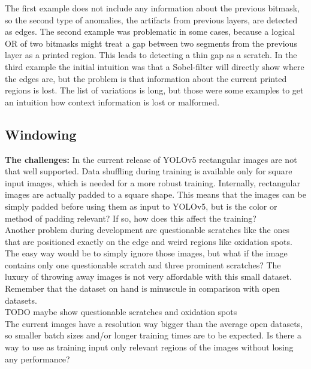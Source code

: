 The first example does not include any information about the previous bitmask, so the second type of anomalies, the artifacts from previous layers, are detected as edges. The second example was problematic in some cases, because a logical OR of two bitmasks might treat a gap between two segments from the previous layer as a printed region. This leads to detecting a thin gap as a scratch. In the third example the initial intuition was that a Sobel-filter will directly show where the edges are, but the problem is that information about the current printed regions is lost. The list of variations is long, but those were some examples to get an intuition how context information is lost or malformed.

\subsection{Windowing}

\textbf{The challenges:} In the current release of YOLOv5 rectangular images are not that well supported. Data shuffling during training is available only for square input images, which is needed for a more robust training. Internally, rectangular images are actually padded to a square shape. This means that the images can be simply padded before using them as input to YOLOv5, but is the color or method of padding relevant? If so, how does this affect the training? \\
Another problem during development are questionable scratches like the ones that are positioned exactly on the edge and weird regions like oxidation spots. The easy way would be to simply ignore those images, but what if the image contains only one questionable scratch and three prominent scratches? The luxury of throwing away images is not very affordable with this small dataset. Remember that the dataset on hand is minuscule in comparison with open datasets. \\

TODO maybe show questionable scratches and oxidation spots \\

The current images have a resolution way bigger than the average open datasets, so smaller batch sizes and/or longer training times are to be expected. Is there a way to use as training input only relevant regions of the images without losing any performance?\\

